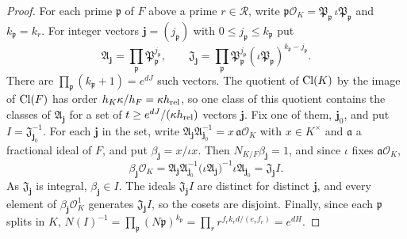 \begin{proof}
For each prime $\mathfrak p$ of $F$ above a prime $r\in\mathcal R$, write
$\mathfrak p\mathcal O_K=\mathfrak P_{\mathfrak p}\,\iota\mathfrak
P_{\mathfrak p}$ and $k_{\mathfrak p}=k_r$. For integer vectors
$\boldsymbol j=(j_{\mathfrak p})$ with $0\le j_{\mathfrak p}\le
k_{\mathfrak p}$ put
\[
 \mathfrak A_{\boldsymbol j}=\prod_{\mathfrak p}
 \mathfrak P_{\mathfrak p}^{j_{\mathfrak p}},\qquad
 \mathfrak J_{\boldsymbol j}=\prod_{\mathfrak p}
 \mathfrak P_{\mathfrak p}^{j_{\mathfrak p}}
 (\iota\mathfrak P_{\mathfrak p})^{k_{\mathfrak p}-j_{\mathfrak p}}.
\]
There are $\prod_{\mathfrak p}(k_{\mathfrak p}+1)=e^{dJ}$ such vectors.
The quotient of $\operatorname{Cl}(K)$ by the image of $\operatorname{Cl}(F)$ has order
$h_K\kappa/h_F=\kappa h_{\rm rel}$, so one class of this quotient
contains the classes of $\mathfrak A_{\boldsymbol j}$ for a set of
$t\ge e^{dJ}/(\kappa h_{\rm rel})$ vectors $\boldsymbol j$. Fix one of
them, $\boldsymbol j_0$, and put $I=\mathfrak J_{\boldsymbol j_0}^{-1}$.
For each $\boldsymbol j$ in the set, write
$\mathfrak A_{\boldsymbol j}\mathfrak A_{\boldsymbol j_0}^{-1}
=x\,\mathfrak a\mathcal O_K$ with $x\in K^\times$ and $\mathfrak a$ a
fractional ideal of $F$, and put $\beta_{\boldsymbol j}=x/\iota x$.
Then $N_{K/F}\beta_{\boldsymbol j}=1$, and since $\iota$ fixes
$\mathfrak a\mathcal O_K$,
\[
 \beta_{\boldsymbol j}\mathcal O_K
 =\mathfrak A_{\boldsymbol j}\mathfrak A_{\boldsymbol j_0}^{-1}
 \bigl(\iota\mathfrak A_{\boldsymbol j}\bigr)^{-1}
 \iota\mathfrak A_{\boldsymbol j_0}
 =\mathfrak J_{\boldsymbol j}I.
\]
As $\mathfrak J_{\boldsymbol j}$ is integral,
$\beta_{\boldsymbol j}\in I$. The ideals $\mathfrak J_{\boldsymbol j}I$
are distinct for distinct $\boldsymbol j$, and every element of
$\beta_{\boldsymbol j}\mathcal O_K^1$ generates
$\mathfrak J_{\boldsymbol j}I$, so the cosets are disjoint. Finally,
since each $\mathfrak p$ splits in $K$,
$N(I)^{-1}=\prod_{\mathfrak p}(N\mathfrak p)^{k_{\mathfrak p}}
=\prod_r r^{f_rk_rd/(e_rf_r)}=e^{dH}$.
\end{proof}

